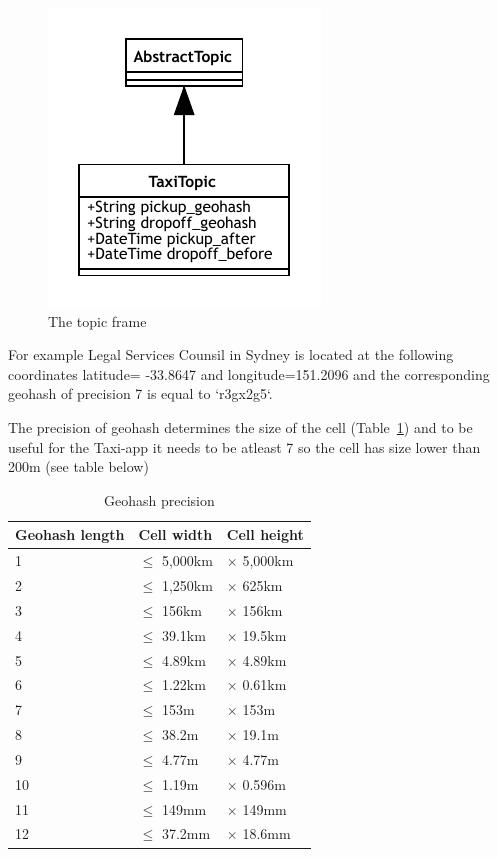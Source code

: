 \documentclass{article}
\begin{document}
\begin{figure}
	\centering
	\includegraphics[scale=1.0]{Topic.pdf}
	\caption{The topic frame}
	\label{fig:fr:topic}
\end{figure}


For example Legal Services Counsil in Sydney is located at the following coordinates latitude= -33.8647 and longitude=151.2096 and the corresponding geohash of precision 7 is equal to `r3gx2g5`.

The precision of geohash determines the size of the cell (Table~\ref{tab:geoprec}) and to be useful for the Taxi-app it needs to be atleast 7 so the cell has size lower than 200m (see table below)

\begin{table}
	\centering
	\begin{tabular}{lll}
		\toprule
		Geohash length & Cell width & Cell height \\
		\midrule
		1  & $\le$ 5,000km & $\times$ 5,000km \\
		2  & $\le$ 1,250km & $\times$ 625km   \\
		3  & $\le$ 156km   & $\times$ 156km   \\
		4  & $\le$ 39.1km  & $\times$ 19.5km  \\
		5  & $\le$ 4.89km  & $\times$ 4.89km  \\
		6  & $\le$ 1.22km  & $\times$ 0.61km  \\
		7  & $\le$ 153m    & $\times$ 153m    \\
		8  & $\le$ 38.2m   & $\times$ 19.1m   \\
		9  & $\le$ 4.77m   & $\times$ 4.77m   \\
		10 & $\le$ 1.19m   & $\times$ 0.596m  \\
		11 & $\le$ 149mm   & $\times$ 149mm   \\
		12 & $\le$ 37.2mm  & $\times$ 18.6mm  \\
		\bottomrule
	\end{tabular}
	\caption{Geohash precision}
	\label{tab:geoprec}
\end{table}
\end{document}
